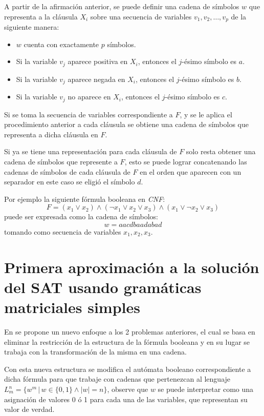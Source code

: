 \documentclass[12pt]{article}
\begin{document}
A partir de la afirmación anterior, se puede definir una cadena de símbolos $w$ que representa a la cláusula $X_i$ sobre una secuencia de variables $v_1,v_2,\ldots,v_p$ de la siguiente manera:

\begin{itemize}
      \item $w$ cuenta con exactamente $p$ símbolos.
      \item Si la variable $v_j$ aparece positiva en $X_i$, entonces el $j$-ésimo símbolo es $a$.
      \item Si la variable $v_j$ aparece negada en $X_i$, entonces el $j$-ésimo símbolo es $b$.
      \item Si la variable $v_j$ no aparece en $X_i$, entonces el $j$-ésimo símbolo es $c$.
\end{itemize}
Si se toma la secuencia de variables correspondiente a $F$, y se le aplica el procedimiento anterior a cada cláusula
se obtiene una cadena de símbolos que representa a dicha cláusula en $F$.

Si ya se tiene una representación para cada cláusula de $F$ solo resta obtener una cadena de símbolos que represente a $F$,
esto se puede lograr concatenando las cadenas de símbolos de cada cláusula de $F$ en el orden que aparecen con un separador
en este caso se eligió el símbolo $d$.

Por ejemplo la siguiente fórmula booleana en \textit{CNF}:
$$F=(x_1 \vee x_2) \wedge (\neg x_1 \vee x_2 \vee x_3) \wedge (x_1 \vee \neg x_2 \vee x_3)$$
puede ser expresada como la cadena de símbolos:
$$w=aacdbaadabad$$
tomando como secuencia de variables $x_1, x_2, x_3$.


\section{Primera aproximación a la solución del SAT usando gramáticas matriciales simples}

En \cite{aSMSAT} se propone un nuevo enfoque a los 2 problemas anteriores, el cual se basa en eliminar la restricción de la estructura de la fórmula booleana y 
en su lugar se trabaja con la transformación de la misma en una cadena.

Con esta nueva estructura se modifica el autómata booleano correspondiente a dicha fórmula para que trabaje con 
cadenas que pertenezcan al lenguaje $L^n_m=\{w^m\,|\,w\in\{0,1\} \wedge |w|=n\}$, observe que $w$ se puede 
interpretar como una asignación de valores 0 ó 1 para cada una de las variables, que representan su valor de verdad.
\end{document}
